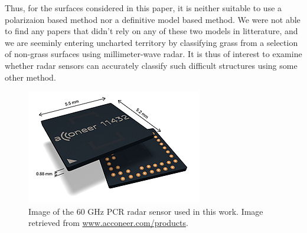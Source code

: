 Thus, for the surfaces considered in this paper, it is neither suitable to use a polarizaion based method nor a definitive model based method. We were not able to find any papers that didn't rely on any of these two models in litterature, and we are seeminly entering uncharted territory by classifying grass from a selection of non-grass surfaces using millimeter-wave radar. It is thus of interest to examine whether radar sensors can accurately classify such difficult structures using some other method. 




















\begin{figure}
	\centering
	\includegraphics[scale=0.8]{figs_temp/acc_sensor}
	\caption{Image of the 60 GHz PCR radar sensor used in this work. Image retrieved from \url{www.acconeer.com/products}.}
	\label{fig:acc_sens}
\end{figure}


